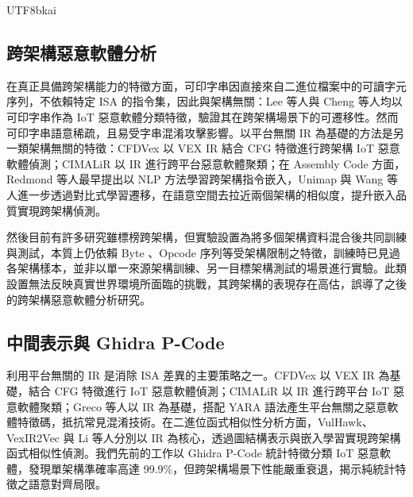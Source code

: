 \documentclass[10pt, a4paper, twocolumn]{article}
\begin{document}
\begin{CJK*}{UTF8}{bkai}
\subsection{跨架構惡意軟體分析}

在真正具備跨架構能力的特徵方面，可印字串因直接來自二進位檔案中的可讀字元序列，不依賴特定 ISA 的指令集，因此與架構無關：Lee 等人與 Cheng 等人\cite{lee2020cross,cheng2025lightweight}均以可印字串作為 IoT 惡意軟體分類特徵，驗證其在跨架構場景下的可遷移性。然而可印字串語意稀疏，且易受字串混淆攻擊影響。以平台無關 IR 為基礎的方法是另一類架構無關的特徵：CFDVex\cite{phu2019cfdvex} 以 VEX IR 結合 CFG 特徵進行跨架構 IoT 惡意軟體偵測；CIMALiR\cite{rahat2024cimalir} 以 IR 進行跨平台惡意軟體聚類；在 Assembly Code 方面，Redmond 等人\cite{redmond2018cross}最早提出以 NLP 方法學習跨架構指令嵌入，Unimap\cite{wang2023retargeted} 與 Wang 等人\cite{wang2024learning}進一步透過對比式學習遷移，在語意空間去拉近兩個架構的相似度，提升嵌入品質實現跨架構偵測。

然後目前有許多研究\cite{vasan2020mthael,chaganti2022deep,ravi2022attention}雖標榜跨架構，但實驗設置為將多個架構資料混合後共同訓練與測試，本質上仍依賴 Byte 、Opcode 序列等受架構限制之特徵，訓練時已見過各架構樣本，並非以單一來源架構訓練、另一目標架構測試的場景進行實驗。此類設置無法反映真實世界環境所面臨的挑戰，其跨架構的表現存在高估，誤導了之後的跨架構惡意軟體分析研究。

\subsection{中間表示與 Ghidra P-Code}

利用平台無關的 IR 是消除 ISA 差異的主要策略之一。CFDVex\cite{phu2019cfdvex} 以 VEX IR 為基礎，結合 CFG 特徵進行 IoT 惡意軟體偵測；CIMALiR\cite{rahat2024cimalir} 以 IR 進行跨平台 IoT 惡意軟體聚類；Greco 等人\cite{greco2025cross}以 IR 為基礎，搭配 YARA 語法產生平台無關之惡意軟體特徵碼，抵抗常見混淆技術。在二進位函式相似性分析方面，VulHawk\cite{luo2023vulhawk}、VexIR2Vec\cite{venkatakeerthy2025vexir2vec} 與 Li 等人\cite{li2025binary}分別以 IR 為核心，透過圖結構表示與嵌入學習實現跨架構函式相似性偵測。我們先前的工作\cite{lin2025cross}以 Ghidra P-Code 統計特徵分類 IoT 惡意軟體，發現單架構準確率高達 99.9\%，但跨架構場景下性能嚴重衰退，揭示純統計特徵之語意對齊局限。


\end{CJK*}
\end{document}
